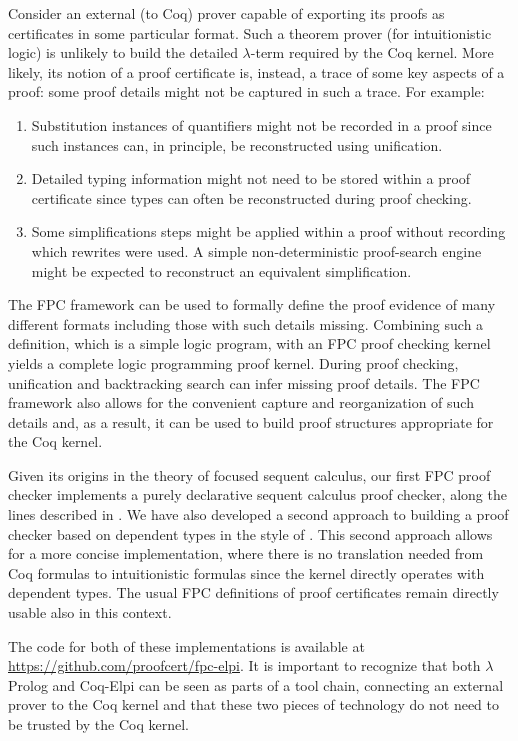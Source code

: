 \documentclass[submission,copyright,creativecommons]{eptcs}
\newcommand{\lP}{$\lambda$Prolog\xspace}
\begin{document}
Consider an external (to Coq) prover capable of exporting its proofs
as certificates in some particular format.  Such a theorem prover (for
intuitionistic logic) is unlikely to build the detailed $\lambda$-term
required by the Coq kernel.  More likely, its notion of a proof
certificate is, instead, a trace of some key aspects of a proof: some
proof details might not be captured in such a trace.  For example:
\begin{enumerate}
\item Substitution instances of quantifiers might not be recorded in a
  proof since such instances can, in principle, be reconstructed using
  unification.

\item Detailed typing information might not need to be stored within a
  proof certificate since types can often be reconstructed during
  proof checking.

\item Some simplifications steps might be applied within a proof
  without recording which rewrites were used.  A simple
  non-deterministic proof-search engine might be expected to
  reconstruct an equivalent simplification.
\end{enumerate}
The FPC framework can be used to formally define the proof evidence of
many different formats \cite{chihani17jar} including those with such
details missing.  Combining such a definition, which is a simple logic
program, with an FPC proof checking kernel yields a complete logic
programming proof kernel.  During proof checking, unification and
backtracking search can infer missing proof details.  The FPC
framework also allows for the convenient capture and reorganization of
such details and, as a result, it can be used to build proof
structures appropriate for the Coq kernel.

Given its origins in the theory of focused sequent calculus, our first
FPC proof checker implements a purely declarative sequent calculus
proof checker, along the lines described in \cite{chihani17jar}.  We
have also developed a second approach to building a proof checker
based on dependent types in the style of \cite{lengrand10lmcs}.  This
second approach allows for a more concise implementation, where there
is no translation needed from Coq formulas to intuitionistic formulas
since the kernel directly operates with dependent types. The usual FPC
definitions of proof certificates remain directly usable also in this
context.

The code for both of these implementations is available at
\url{https://github.com/proofcert/fpc-elpi}.  It is important to
recognize that both \lP and Coq-Elpi can be seen as parts of a tool
chain, connecting an external prover to the Coq kernel and that these
two pieces of technology do not need to be trusted by the Coq kernel. 
\end{document}
